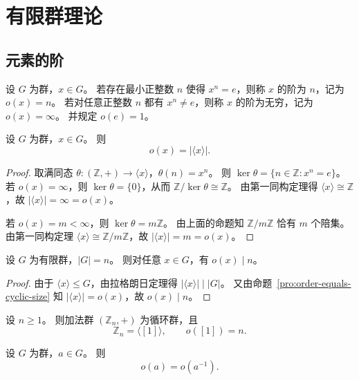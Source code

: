 \documentclass[lang=cn,a4paper,newtx]{elegantbook}
\begin{document}
\chapter{有限群理论}

\section{元素的阶}

\begin{definition}[元素的阶]
设 $G$ 为群，$x\in G$。
若存在最小正整数 $n$ 使得 $x^n=e$，则称 $x$ 的阶为 $n$，记为 $o(x)=n$。
若对任意正整数 $n$ 都有 $x^n\ne e$，则称 $x$ 的阶为无穷，记为 $o(x)=\infty$。
并规定 $o(e)=1$。
\end{definition}

\begin{proposition}\label{order-equals-cyclic-size}
设 $G$ 为群，$x\in G$。
则
\[
  o(x)=|\langle x\rangle|.
\]
\end{proposition}

\begin{proof}
取满同态 $\theta:(\mathbb{Z},+)\to \langle x\rangle$，$\theta(n)=x^n$。
则 $\ker\theta=\{n\in \mathbb{Z}:x^n=e\}$。
若 $o(x)=\infty$，则 $\ker\theta=\{0\}$，从而 $\mathbb{Z}/\ker\theta\cong \mathbb{Z}$。
由第一同构定理得 $\langle x\rangle\cong \mathbb{Z}$，故 $|\langle x\rangle|=\infty=o(x)$。

若 $o(x)=m<\infty$，则 $\ker\theta=m\mathbb{Z}$。
由上面的命题知 $\mathbb{Z}/m\mathbb{Z}$ 恰有 $m$ 个陪集。
由第一同构定理 $\langle x\rangle\cong \mathbb{Z}/m\mathbb{Z}$，故 $|\langle x\rangle|=m=o(x)$。
\end{proof}

\begin{proposition}
设 $G$ 为有限群，$|G|=n$。
则对任意 $x\in G$，有 $o(x)\mid n$。
\end{proposition}

\begin{proof}
由于 $\langle x\rangle\le G$，由拉格朗日定理得 $|\langle x\rangle|\mid |G|$。
又由命题~\ref{pro:order-equals-cyclic-size} 知 $|\langle x\rangle|=o(x)$，故 $o(x)\mid n$。
\end{proof}

\begin{example}
设 $n\ge 1$。
则加法群 $(\mathbb{Z}_n,+)$ 为循环群，且
\[
  \mathbb{Z}_n=\langle [1]\rangle,
\qquad
  o([1])=n.
\]
\end{example}

\begin{proposition}
  设 $G$ 为群，$a\in G$。
  则
  \[
    o(a)=o(a^{-1}).
  \]
\end{proposition}
\end{document}
